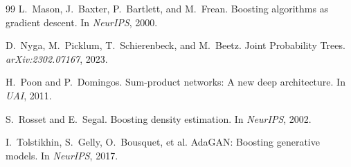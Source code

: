\documentclass[11pt]{article}
\theoremstyle{plain}
\theoremstyle{definition}
\theoremstyle{remark}
\begin{document}
\begin{thebibliography}{99}
L.~Mason, J.~Baxter, P.~Bartlett, and M.~Frean. Boosting algorithms as
gradient descent. In \emph{NeurIPS}, 2000.

D.~Nyga, M.~Picklum, T.~Schierenbeck, and M.~Beetz. Joint Probability
Trees. \emph{arXiv:2302.07167}, 2023.

H.~Poon and P.~Domingos. Sum-product networks: A new deep architecture. In
\emph{UAI}, 2011.

S.~Rosset and E.~Segal. Boosting density estimation. In \emph{NeurIPS},
2002.

I.~Tolstikhin, S.~Gelly, O.~Bousquet, et al. AdaGAN: Boosting generative
models. In \emph{NeurIPS}, 2017.

\end{thebibliography}
\end{document}
